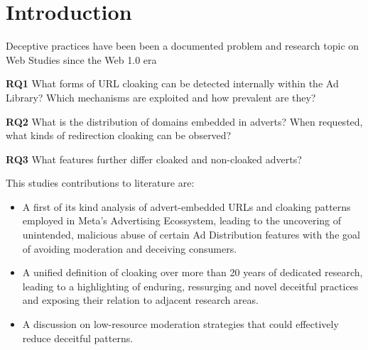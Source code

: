 
\section{Introduction}
Deceptive practices have been been a documented problem and research topic on Web Studies since the Web 1.0 era \cite{wwwCloak2006}

\textbf{RQ1} What forms of URL cloaking can be detected internally within the Ad Library? Which mechanisms are exploited and how prevalent are they?


\textbf{RQ2} What is the distribution of domains embedded in adverts? When requested, what kinds of redirection cloaking can be observed?



\textbf{RQ3} What features further differ cloaked and non-cloaked adverts?



This studies contributions to literature are:
\begin{itemize}
    \item A first of its kind analysis of advert-embedded URLs and cloaking patterns employed in Meta's Advertising Ecossystem, leading to the uncovering of unintended, malicious abuse of certain Ad Distribution features with the goal of avoiding moderation and deceiving consumers.
    \item A unified definition of cloaking over more than 20 years of dedicated research, leading to a highlighting of enduring, ressurging and novel deceitful practices and exposing their relation to adjacent research areas.
    \item A discussion on low-resource moderation strategies that could effectively reduce deceitful patterns. 
\end{itemize}
